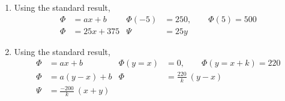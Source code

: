 \begin{enumerate}
    \item Using the standard result,
          \begin{align}
              \Phi     & = ax + b                    &
              \Phi(-5) & = 250, \qquad \Phi(5) = 500   \\
              \Phi     & = 25x + 375                 &
              \Psi     & = 25y
          \end{align}

    \item Using the standard result,
          \begin{align}
              \Phi      & = ax + b                      &
              \Phi(y=x) & = 0, \qquad \Phi(y=x+k) = 220   \\
              \Phi      & = a(y-x) + b                  &
              \Phi      & = \frac{220}{k}\ (y-x)          \\
              \Psi      & = \frac{-200}{k}\ (x + y)
          \end{align}


\end{enumerate}
